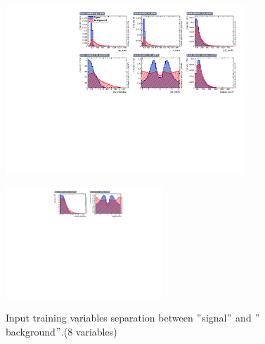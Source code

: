 			\begin{figure}[H]
			\centering{}
    			\includegraphics[width=0.8\textwidth]{Figures/EventSelReco/mva/t13_VarSep1.pdf}\\
			\end{figure}
			\FloatBarrier
			\begin{figure}[H]
			\centering{}
    			\includegraphics[width=0.528\textwidth]{Figures/EventSelReco/mva/t13_VarSep2.pdf}\\
    		\caption{Input training variables separation between $"$signal$"$ and $"$background$"$.(8 variables)}
			\label{EventSelReco:fig:t13_varsep}
			\end{figure}
			\FloatBarrier

